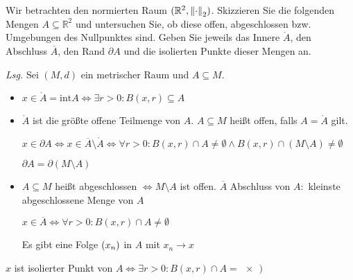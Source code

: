\documentclass{article}
\begin{document}
Wir betrachten den normierten Raum $(\mathbb{R}^2, \norm{\cdot}_2)$.
Skizzieren Sie die folgenden Mengen $A \subseteq \mathbb{R}^2$ und untersuchen Sie,
ob diese offen, abgeschlossen bzw. Umgebungen des Nullpunktes sind.
Geben Sie jeweils das Innere $\mathring A$, den Abschluss $\overline{A}$,
den Rand $\partial A$ und die isolierten Punkte dieser Mengen an.

\textit{Lsg.} Sei $(M, d)$ ein metrischer Raum und $A \subseteq M$.

\begin{itemize}
\item $x \in \mathring A = \text{int} A \iff \exists r > 0 \colon B(x, r) \subseteq A$
\item $\mathring A$ ist die größte offene Teilmenge von $A$.
  $A \subseteq M$ heißt offen, falls $A = \mathring A$ gilt.

  $x \in \partial A \iff x \in \overline A \setminus \mathring A
  \iff \forall r > 0 \colon B(x, r) \cap A \ne \emptyset \land B(x, r) \cap (M \setminus A) \ne \emptyset$

  $\partial A = \partial (M \setminus A)$
\item $A \subseteq M$ heißt abgeschlossen $\iff M \setminus A$ ist offen.
  $\overline A$ Abschluss von $A \colon$ kleinste abgeschlossene Menge von $A$

  $x \in \overline A \iff \forall r > 0 \colon B(x, r) \cap A \ne \emptyset$

  Es gibt eine Folge $\qty(x_n)$ in $A$ mit $x_n \to x$
\end{itemize}

$x$ ist isolierter Punkt von $A \iff \exists r > 0 \colon B(x, r) \cap A = \qty{x})$
\end{document}
